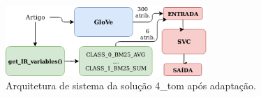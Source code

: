 \begin{figure}[h]
    \centering
    \caption{Arquitetura de sistema da solução 4\_tom após adaptação.}
    \begin{center}
        \includegraphics[width=0.68\textwidth]{img/4-tom-arquitetura-com-ri.png}
    \end{center}
    \vspace{-0.5cm}
    \label{fig:4-tom-arquitetura-com-ri}
\end{figure}